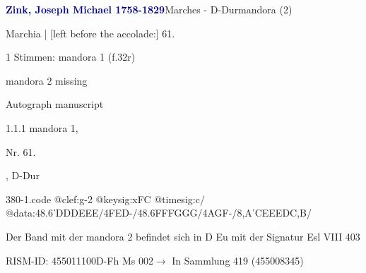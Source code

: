\documentclass[twocolumn, 12pt]{book}
\begin{document}
\par \vspace{16pt} \textcolor{darkblue}{\textbf{Zink, Joseph Michael  1758-1829}}\hfillplus{\textbf{[380]}}\newline Marches - D-Dur\newline mandora (2)
\par \begin{itshape}[f.32r, at left:] Marchia | [left before the accolade:] 61.\end{itshape} 
\par \textcolor{darkblue}{}  1 Stimmen: mandora 1  (f.32r)\newline \begin{small} mandora 2 missing\end{small} \newline Autograph manuscript
\par 1.1.1  mandora 1, \begin{itshape}Nr. 61.\end{itshape}, D-Dur  
\begin{filecontents*}{380-1.code}
@clef:g-2
@keysig:xFC
@timesig:c/
@data:48.6'D{DD}E{EE}/4FED-/48.6F{FF}G{GG}/4AGF-/8,A'CEEEDC,B/
\end{filecontents*}
\newline %
\par Der Band mit der mandora 2 befindet sich in D Eu mit der Signatur Esl VIII 403
\par RISM-ID: 455011100\newline D-Fh  Ms 002\newline $\rightarrow$ In Sammlung 419 (455008345)
      
\end{document}
